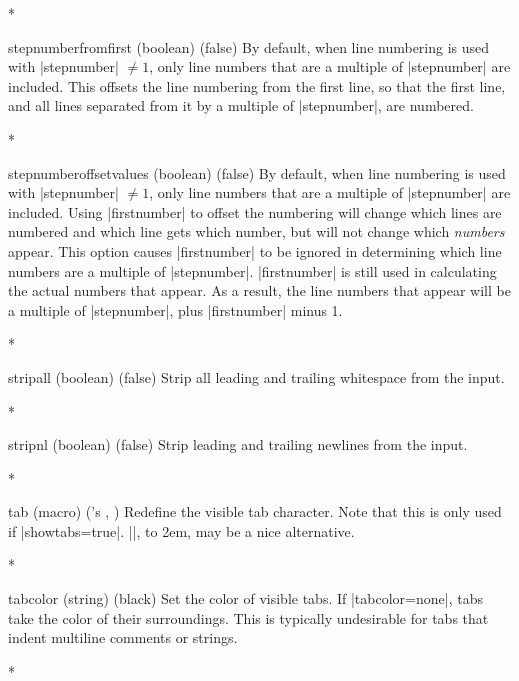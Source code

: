 \begin{paracol}{2}
\begin{optionlist}
    \switchcolumn[0]*%

\item[stepnumberfromfirst (boolean) (false)]
By default, when line numbering is used with |stepnumber| $\ne 1$, only line numbers that are a multiple of |stepnumber| are included.  This offsets the line numbering from the first line, so that the first line, and all lines separated from it by a multiple of |stepnumber|, are numbered.

\switchcolumn

\switchcolumn[0]*%
\item[stepnumberoffsetvalues (boolean) (false)]
By default, when line numbering is used with |stepnumber| $\ne 1$, only line numbers that are a multiple of |stepnumber| are included.  Using |firstnumber| to offset the numbering will change which lines are numbered and which line gets which number, but will not change which \emph{numbers} appear.  This option causes |firstnumber| to be ignored in determining which line numbers are a multiple of |stepnumber|.  |firstnumber| is still used in calculating the actual numbers that appear.  As a result, the line numbers that appear will be a multiple of |stepnumber|, plus |firstnumber| minus 1.
\switchcolumn

\switchcolumn[0]*%

  \item[stripall (boolean) (false)]
    Strip all leading and trailing whitespace from the input.
    \switchcolumn

\switchcolumn[0]*%
  \item[stripnl (boolean) (false)]
    Strip leading and trailing newlines from the input.

    \switchcolumn

    \switchcolumn[0]*%
\item[tab (macro) ({\rmfamily\pkg{fancyvrb}'s} \string\FancyVerbTab, \FancyVerbTab)]
Redefine the visible tab character.  Note that this is only used if |showtabs=true|.  |\rightarrowfill|, \hbox to 2em{\rightarrowfill}, may be a nice alternative.
\switchcolumn

\switchcolumn[0]*%

\item[tabcolor (string) (black)]
Set the color of visible tabs.  If |tabcolor=none|, tabs take the color of their surroundings.  This is typically undesirable for tabs that indent multiline comments or strings.
\switchcolumn

\switchcolumn[0]*%


\end{optionlist}
\end{paracol}
